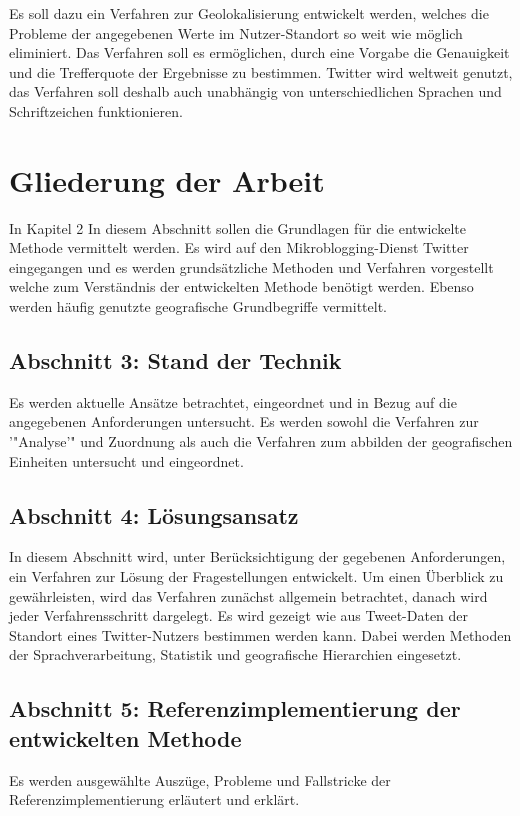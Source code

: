 		Es soll dazu ein Verfahren zur Geolokalisierung entwickelt werden, welches die Probleme der angegebenen Werte im Nutzer-Standort so weit wie möglich eliminiert.
		Das Verfahren soll es ermöglichen, durch eine Vorgabe die Genauigkeit und die Trefferquote der Ergebnisse zu bestimmen.
		Twitter wird weltweit genutzt, das Verfahren soll deshalb auch unabhängig von unterschiedlichen Sprachen und Schriftzeichen funktionieren.


	\section{Gliederung der Arbeit}

			In Kapitel 2 
			In diesem Abschnitt sollen die Grundlagen für die entwickelte Methode vermittelt werden. 
			Es wird auf den Mikroblogging-Dienst Twitter eingegangen und es werden grundsätzliche Methoden und Verfahren vorgestellt welche zum Verständnis der entwickelten Methode benötigt werden. 
			Ebenso werden häufig genutzte geografische Grundbegriffe vermittelt.

		\subsection*{Abschnitt 3: Stand der Technik}
			Es werden aktuelle Ansätze betrachtet, eingeordnet und in Bezug auf die angegebenen Anforderungen untersucht.
			Es werden sowohl die Verfahren zur '"Analyse'" und Zuordnung als auch die Verfahren zum abbilden der geografischen Einheiten untersucht und eingeordnet. 

		\subsection*{Abschnitt 4: Lösungsansatz}
			In diesem Abschnitt wird, unter Berücksichtigung der gegebenen Anforderungen, ein Verfahren zur Lösung der Fragestellungen entwickelt. 
			Um einen Überblick zu gewährleisten, wird das Verfahren zunächst allgemein betrachtet, danach wird jeder Verfahrensschritt dargelegt.
			Es wird gezeigt wie aus Tweet-Daten der Standort eines Twitter-Nutzers bestimmen werden kann.
			Dabei werden Methoden der Sprachverarbeitung, Statistik und geografische Hierarchien eingesetzt. 

		\subsection*{Abschnitt 5: Referenzimplementierung der entwickelten Methode}
			Es werden ausgewählte Auszüge, Probleme und Fallstricke der Referenzimplementierung erläutert und erklärt. 

